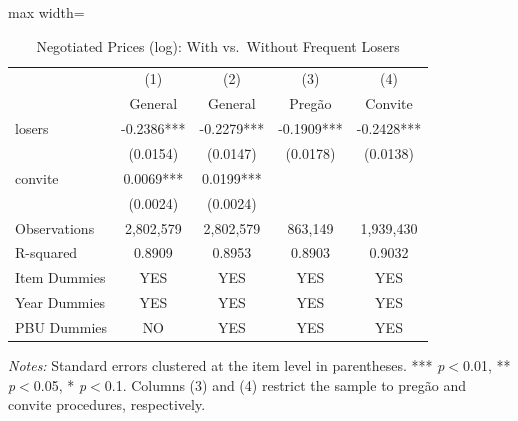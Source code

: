 \begin{table}[htbp]
\centering
\caption{Negotiated Prices (log): With vs.\ Without Frequent Losers}
\label{tab:prices}
\begin{adjustbox}{max width=\textwidth}
\begin{threeparttable}
\small
\begin{tabular}{lcccc}
\toprule
 & (1) & (2) & (3) & (4) \\
 & General & General & Preg\~{a}o & Convite \\
\midrule
losers & -0.2386*** & -0.2279*** & -0.1909*** & -0.2428*** \\
 & (0.0154) & (0.0147) & (0.0178) & (0.0138) \\
convite & 0.0069*** & 0.0199*** &  &  \\
 & (0.0024) & (0.0024) &  &  \\
\midrule
Observations & 2,802,579 & 2,802,579 & 863,149 & 1,939,430 \\
R-squared & 0.8909 & 0.8953 & 0.8903 & 0.9032 \\
Item Dummies & YES & YES & YES & YES \\
Year Dummies & YES & YES & YES & YES \\
PBU Dummies & NO & YES & YES & YES \\
\bottomrule
\end{tabular}
\begin{tablenotes}
\small
\item \textit{Notes:} Standard errors clustered at the item level in parentheses.
*** \textit{p}$<$0.01, ** \textit{p}$<$0.05, * \textit{p}$<$0.1.
Columns (3) and (4) restrict the sample to preg\~{a}o and convite procedures, respectively.
\end{tablenotes}
\end{threeparttable}
\end{adjustbox}
\end{table}
